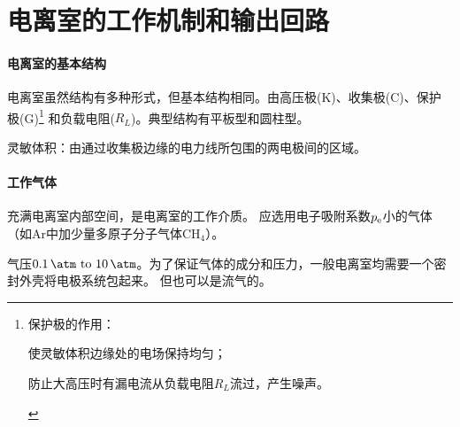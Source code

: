 \section{电离室的工作机制和输出回路}

\paragraph{电离室的基本结构}
电离室虽然结构有多种形式，但基本结构相同。由高压极(K)、收集极(C)、保护极(G)\footnote{
	保护极的作用：
	\begin{compactenum}
		\item 使灵敏体积边缘处的电场保持均匀；
		\item 防止大高压时有漏电流从负载电阻$R_L$流过，产生噪声。
	\end{compactenum}
}
和负载电阻($R_L$)。典型结构有平板型和圆柱型。



灵敏体积：由通过收集极边缘的电力线所包围的两电极间的区域。
\paragraph{工作气体}
充满电离室内部空间，是电离室的工作介质。
应选用电子吸附系数$p_\mathrm e$小的气体（如Ar中加少量多原子分子气体CH$_4$）。

气压$\SIrange{0.1}{10}{\atm}$。为了保证气体的成分和压力，一般电离室均需要一个密封外壳将电极系统包起来。
但也可以是流气的。
